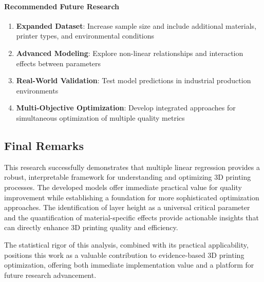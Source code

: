\paragraph{Recommended Future Research}
\begin{enumerate}
    \item \textbf{Expanded Dataset}: Increase sample size and include additional materials, printer types, and environmental conditions
    \item \textbf{Advanced Modeling}: Explore non-linear relationships and interaction effects between parameters
    \item \textbf{Real-World Validation}: Test model predictions in industrial production environments
    \item \textbf{Multi-Objective Optimization}: Develop integrated approaches for simultaneous optimization of multiple quality metrics
\end{enumerate}

\subsection{Final Remarks}

This research successfully demonstrates that multiple linear regression provides a robust, interpretable framework for understanding and optimizing 3D printing processes. The developed models offer immediate practical value for quality improvement while establishing a foundation for more sophisticated optimization approaches. The identification of layer height as a universal critical parameter and the quantification of material-specific effects provide actionable insights that can directly enhance 3D printing quality and efficiency.

The statistical rigor of this analysis, combined with its practical applicability, positions this work as a valuable contribution to evidence-based 3D printing optimization, offering both immediate implementation value and a platform for future research advancement.
